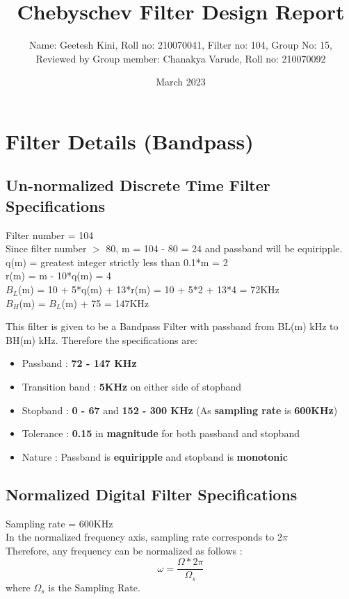 \documentclass{article}
\title{Chebyschev Filter Design Report}
\author{Name: Geetesh Kini, Roll no: 210070041, Filter no: 104, Group No: 15,\\ Reviewed by Group member: Chanakya Varude, Roll no: 210070092}
\date{March 2023}
\begin{document}
\maketitle

\tableofcontents
\clearpage

\section{Filter Details (Bandpass)}

\subsection{Un-normalized Discrete Time Filter Specifications}

Filter number = 104\\
Since filter number $>$ 80, m = 104 - 80 = 24 and passband will be equiripple.\\
q(m) = greatest integer strictly less than 0.1*m = 2\\
r(m) = m - 10*q(m) = 4\\
$B_L$(m) = 10 + 5*q(m) + 13*r(m) = 10 + 5*2 + 13*4 = 72KHz \\
$B_H$(m) = $B_L$(m) + 75 = 147KHz\\

\vspace{1.5em}
\noindent

This filter is given to be a Bandpass Filter with passband from BL(m) kHz to BH(m) kHz.
Therefore the specifications are:
\begin{itemize}
    \item Passband : \textbf{72 - 147 KHz}
    \item  Transition band : \textbf{5KHz} on either side of stopband
    \item Stopband : \textbf{0 - 67} and \textbf{152 - 300 KHz} (As \textbf{sampling rate} is \textbf{600KHz})

    \item  Tolerance : \textbf{0.15} in \textbf{magnitude} for both passband and stopband
    \item  Nature : Passband is \textbf{equiripple} and stopband is \textbf{monotonic}
\end{itemize}

\subsection{Normalized Digital Filter Specifications}
Sampling rate = 600KHz\\
In the normalized frequency axis, sampling rate corresponds to 2$\pi$\\
Therefore, any frequency can be normalized as follows :
\begin{equation*}
    \omega = \frac{\Omega*2\pi}{\Omega_s}
\end{equation*}
where $\Omega_s$ is the Sampling Rate.\\
\end{document}
